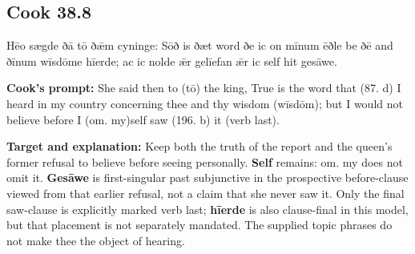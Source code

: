 \par\begin{minipage}{\linewidth}\raggedright
\subsection*{Cook 38.8}

Hēo sægde ðā tō ðǣm cyninge: Sōð is ðæt word ðe ic on mīnum ēðle be ðē and ðīnum wīsdōme hīerde; ac ic nolde ǣr gelīefan ǣr ic self hit gesāwe.

\textbf{Cook's prompt:} She said then to (tō) the king, True is the word that (87. d) I heard in my country concerning thee and thy wisdom (wīsdōm); but I would not believe before I (om. my)self saw (196. b) it (verb last).

\textbf{Target and explanation:} Keep both the truth of the report and the queen's former refusal to believe before seeing personally. \textbf{Self} remains: om. my does not omit it. \textbf{Gesāwe} is first-singular past subjunctive in the prospective before-clause viewed from that earlier refusal, not a claim that she never saw it. Only the final saw-clause is explicitly marked verb last; \textbf{hīerde} is also clause-final in this model, but that placement is not separately mandated. The supplied topic phrases do not make thee the object of hearing.

\end{minipage}\par\addvspace{4pt}

